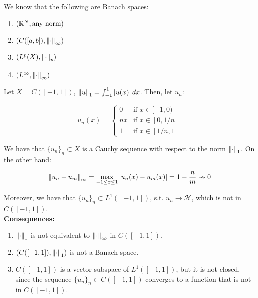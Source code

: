 \begin{fexample}
    We know that the following are Banach spaces:
    \vspace{1em}
    \begin{enumerate}
        \item $(\mathbb{R}^N, \text{any norm})$
        \vspace{1em}
        \item $(C([a, b]), \left\|\cdot\right\|_{\infty})$
        \vspace{1em}
        \item $(L^p(X), \left\|\cdot\right\|_p)$
        \vspace{1em}
        \item $(L^{\infty}, \left\|\cdot\right\|_{\infty})$
    \end{enumerate}
\end{fexample}

\vspace{1em}

\begin{fexample}
    Let $X = C([-1, 1])$, $\left\|u\right\|_1 = \int_{-1}^{1} |u(x)| \, dx$. Then,
    let $u_n$:

    $$u_n(x) = \begin{cases}
        0 & \text{if } x \in [-1, 0) \\
        nx & \text{if } x \in [0, 1/n] \\
        1 & \text{if } x \in [1/n, 1]
    \end{cases}$$

    We have that $\{u_n\}_n \subset X$ is a Cauchy sequence with respect to
    the norm $\left\|\cdot\right\|_1$. On the other hand:

    $$\left\|u_n - u_m\right\|_{\infty} = \max_{-1 \leq x \leq 1} |u_n(x) - u_m(x)| = 1 - \frac{n}{m} \nrightarrow 0$$

    Moreover, we have that $\{u_n\}_n \subset L^1([-1, 1])$, s.t.
    $u_n \to \mathcal{H}$, which is not in $C([-1, 1])$.\\

    \textbf{Consequences:}
    \vspace{1em}
    \begin{enumerate}
        \item $\left\|\cdot\right\|_1$ is not equivalent to $\left\|\cdot\right\|_{\infty}$
        in $C([-1, 1])$.
        \vspace{1em}
        \item $(C([-1, 1]), \left\|\cdot\right\|_1)$ is not a Banach space.
        \vspace{1em}
        \item $C([-1, 1])$ is a vector subspace of $L^1([-1, 1])$,
        but it is not closed, since the sequence $\{u_n\}_n \subset C([-1, 1])$ converges
        to a function that is not in $C([-1, 1])$.
    \end{enumerate}
\end{fexample}






 


